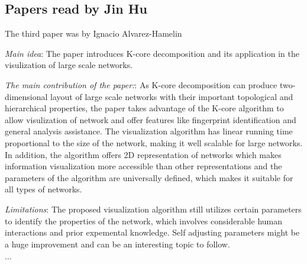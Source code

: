 \subsection{Papers read by Jin Hu}
The third paper was by Ignacio Alvarez-Hamelin
\begin{itemize*}
\item {\em Main idea}: The paper introduces K-core decomposition and its application in the visulization of large scale networks.
\item {\em The main contribution of the paper:}:
      As K-core decomposition can produce two-dimensional layout of large scale networks with their important topological and hierarchical properties, the paper takes advantage of the K-core algorithm to allow visulization of network and offer features like fingerprint identification and general analysis assistance. The visualization algorithm has linear running time proportional to the size of the network, making it well scalable for large networks. In addition, the algorithm offers 2D representation of networks which makes information visualization more accessible than other representations and the parameters of the algorithm are universally defined, which makes it suitable for all types of networks.
\item {\em Limitations}:
      The proposed visualization algorithm still utilizes certain parameters to identify the properties of the network, which involves considerable human interactions and prior expemental knowledge. Self adjusting parameters might be a huge improvement and can be an interesting topic to follow.
\end{itemize*}

$\ldots$

